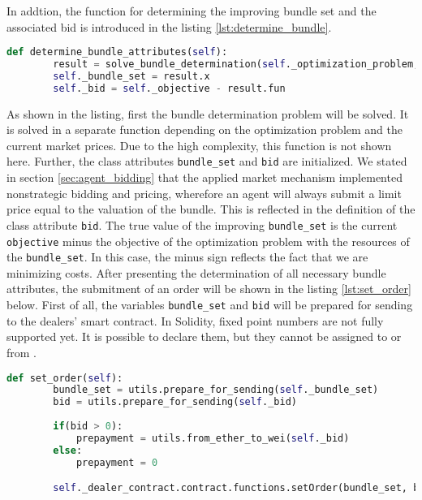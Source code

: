 In addtion, the function for determining the improving bundle set and the associated bid is introduced in the listing \ref{lst:determine_bundle}.

\begin{lstlisting}[label=lst:determine_bundle, caption=Determining of bundle attributes, language=Python]
    def determine_bundle_attributes(self):
        result = solve_bundle_determination(self._optimization_problem, self._mkt_prices)
        self._bundle_set = result.x
        self._bid = self._objective - result.fun
\end{lstlisting}

As shown in the listing, first the bundle determination problem will be solved.
It is solved in a separate function depending on the optimization problem and the current market prices.
Due to the high complexity, this function is not shown here. Further, the class attributes \verb|bundle_set| and \verb|bid| are initialized.
We stated in section \ref{sec:agent_bidding} that the applied market mechanism implemented nonstrategic bidding and pricing, wherefore 
an agent will always submit a limit price equal to the valuation of the bundle. 
This is reflected in the definition of the class attribute \verb|bid|. The true value of the improving \verb|bundle_set| 
is the current \verb|objective| minus the objective of the optimization problem with the resources of the \verb|bundle_set|.
In this case, the minus sign reflects the fact that we are minimizing costs.
After presenting the determination of all necessary bundle attributes, the submitment of an order will be shown in the listing \ref{lst:set_order} below.
First of all, the variables \verb|bundle_set| and \verb|bid| will be prepared for sending to the dealers' smart contract.
In Solidity, fixed point numbers are not fully supported yet. It is possible to declare them, but they cannot be assigned to or from .

\begin{lstlisting}[float=htbp, label=lst:set_order, caption=Submitment of order, language=Python]
    def set_order(self):
        bundle_set = utils.prepare_for_sending(self._bundle_set)
        bid = utils.prepare_for_sending(self._bid)
        
        if(bid > 0):
            prepayment = utils.from_ether_to_wei(self._bid)
        else:
            prepayment = 0

        self._dealer_contract.contract.functions.setOrder(bundle_set, bid, prepayment).transact({'from': self._account_address, 'value': prepayment})
\end{lstlisting}

